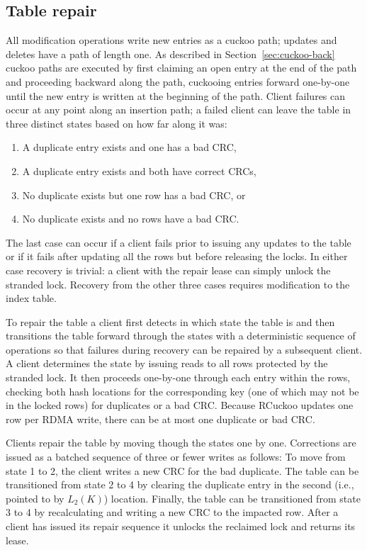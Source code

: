 \subsection{Table repair} 
\label{sec:table-repair}


All modification operations write new entries as a cuckoo path;
updates and deletes have a path of length one.  As described in
Section~\ref{sec:cuckoo-back} cuckoo paths are executed by first
claiming an open entry at the end of the path and proceeding backward
along the path, cuckooing entries forward one-by-one until the new
entry is written at the beginning of the path.  Client failures can
occur at any point along an insertion path; a failed client can leave
the table in three distinct states based on how far along it was:
\begin{enumerate}
\item{A duplicate entry exists and one has a bad CRC,}
    \item{A duplicate entry exists and both have correct CRCs,} 
    \item{No duplicate exists but one row has a bad CRC, or}
      \item{No duplicate exists and no rows have a bad CRC.}
\end{enumerate}
\noindent The last case can occur if a client fails prior to issuing
any updates to the table or if it fails after updating all the rows
but before releasing the locks.  In either case recovery is trivial: a
client with the repair lease can simply unlock the stranded lock.
Recovery from the other three cases requires modification to the index
table.

To repair the table a client first detects in which state the table is
and then transitions the table forward through the states with a
deterministic sequence of operations so that failures during recovery
can be repaired by a subsequent client. A client determines the state
by issuing reads to all rows protected by the stranded lock.  It then
proceeds one-by-one through each entry within the rows, checking both
hash locations for the corresponding key (one of which may not be in
the locked rows) for duplicates or a bad CRC.  Because RCuckoo updates
one row per RDMA write, there can be at most one duplicate or bad CRC.

Clients repair the table by moving though the states one by one.
Corrections are issued as a batched sequence of three or fewer writes
as follows: To move from state 1 to 2, the client writes a new CRC for
the bad duplicate.  The table can be transitioned from state 2 to 4 by
clearing the duplicate entry in the second (i.e., pointed to by
$L_2(K)$) location. Finally, the table can be transitioned from state
3 to 4 by recalculating and writing a new CRC to the impacted
row. After a client has issued its repair sequence it unlocks the
reclaimed lock and returns its lease.


